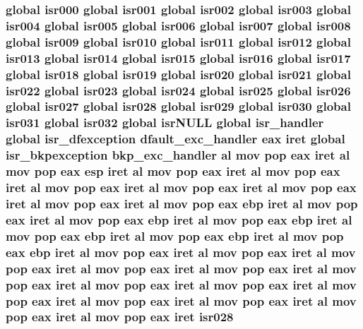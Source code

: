 \subsubsection[{\texorpdfstring{isr028}{isr028}}]{\setlength{\rightskip}{0pt plus 5cm}global {\bf isr000} global {\bf isr001} global {\bf isr002} global {\bf isr003} global {\bf isr004} global {\bf isr005} global {\bf isr006} global {\bf isr007} global {\bf isr008} global {\bf isr009} global {\bf isr010} global {\bf isr011} global {\bf isr012} global {\bf isr013} global {\bf isr014} global {\bf isr015} global {\bf isr016} global {\bf isr017} global {\bf isr018} global {\bf isr019} global {\bf isr020} global {\bf isr021} global {\bf isr022} global {\bf isr023} global {\bf isr024} global {\bf isr025} global {\bf isr026} global {\bf isr027} global isr028 global {\bf isr029} global {\bf isr030} global {\bf isr031} global isr032 global isr\+N\+U\+LL global isr\+\_\+handler global {\bf isr\+\_\+dfexception} {\bf dfault\+\_\+exc\+\_\+handler} eax iret global {\bf isr\+\_\+bkpexception} {\bf bkp\+\_\+exc\+\_\+handler} {\bf al} {\bf mov} pop eax iret {\bf al} {\bf mov} pop eax esp iret {\bf al} {\bf mov} pop eax iret {\bf al} {\bf mov} pop eax iret {\bf al} {\bf mov} pop eax iret {\bf al} {\bf mov} pop eax iret {\bf al} {\bf mov} pop eax iret {\bf al} {\bf mov} pop eax iret {\bf al} {\bf mov} pop eax ebp iret {\bf al} {\bf mov} pop eax iret {\bf al} {\bf mov} pop eax ebp iret {\bf al} {\bf mov} pop eax ebp iret {\bf al} {\bf mov} pop eax ebp iret {\bf al} {\bf mov} pop eax ebp iret {\bf al} {\bf mov} pop eax ebp iret {\bf al} {\bf mov} pop eax iret {\bf al} {\bf mov} pop eax iret {\bf al} {\bf mov} pop eax iret {\bf al} {\bf mov} pop eax iret {\bf al} {\bf mov} pop eax iret {\bf al} {\bf mov} pop eax iret {\bf al} {\bf mov} pop eax iret {\bf al} {\bf mov} pop eax iret {\bf al} {\bf mov} pop eax iret {\bf al} {\bf mov} pop eax iret {\bf al} {\bf mov} pop eax iret {\bf al} {\bf mov} pop eax iret {\bf al} {\bf mov} pop eax iret isr028}\hypertarget{isrs_8as_a2065ca11d13edd6c4aeb7eca0a40f046}{}\label{isrs_8as_a2065ca11d13edd6c4aeb7eca0a40f046}
